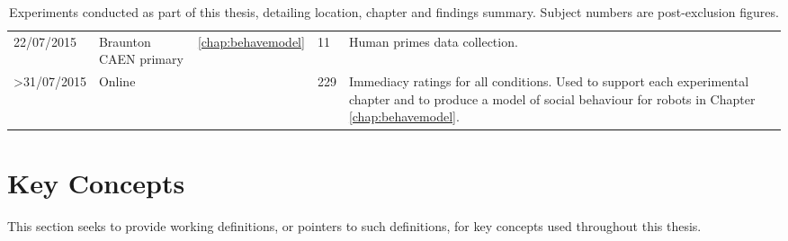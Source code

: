 {\begin{landscape}
\begin{table}[t]
\begin{tabulary}{1.7\textwidth}{@{}llllp{10.5cm}@{}}
		22/07/2015 & Braunton CAEN primary & \ref{chap:behavemodel} & 11 & Human primes data collection. \\
		\textgreater31/07/2015 & Online &  & 229 & Immediacy ratings for all conditions. Used to support each experimental chapter and to produce a model of social behaviour for robots in Chapter \ref{chap:behavemodel}. \\ \hline
		\end{tabulary}
		\caption{Experiments conducted as part of this thesis, detailing location, chapter and findings summary. Subject numbers are post-exclusion figures.}
		\label{tab:exps}
		\end{table}
	\end{landscape}
}

\section{Key Concepts}\label{sec:intro-concepts}
This section seeks to provide working definitions, or pointers to such definitions, for key concepts used throughout this thesis.

